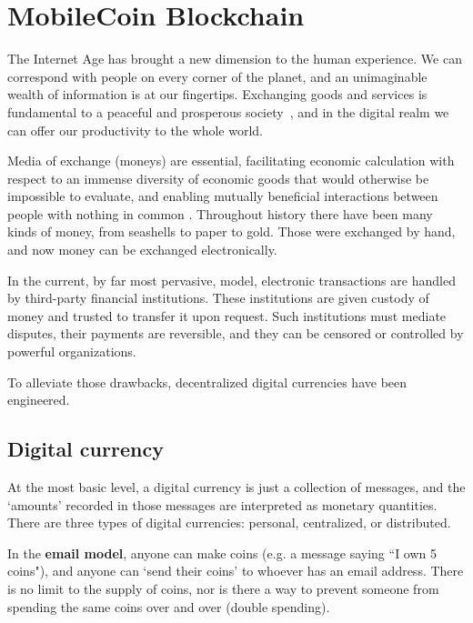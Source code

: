 \chapter{MobileCoin Blockchain}
\label{chapter:blockchain}

The Internet Age has brought a new dimension to the human experience. We can correspond with people on every corner of the planet, and an unimaginable wealth of information is at our fingertips. Exchanging goods and services is fundamental to a peaceful and prosperous society~\cite{human-action}, and in the digital realm we can offer our productivity to the whole world.

Media of exchange (moneys) are essential, facilitating economic calculation with respect to an immense diversity of economic goods that would otherwise be impossible to evaluate, and enabling mutually beneficial interactions between people with nothing in common \cite{human-action}. Throughout history there have been many kinds of money, from seashells to paper to gold. Those were exchanged by hand, and now money can be exchanged electronically.

In the current, by far most pervasive, model, electronic transactions are handled by third-party financial institutions. These institutions are given custody of money and trusted to transfer it upon request. Such institutions must mediate disputes, their payments are reversible, and they can be censored or controlled by powerful organizations. \cite{Nakamoto_bitcoin}

To alleviate those drawbacks, decentralized digital currencies have been engineered.



\section{Digital currency}
\label{sec:digital-currency}

At the most basic level, a digital currency is just a collection of messages, and the `amounts' recorded in those messages are interpreted as monetary quantities. There are three types of digital currencies: personal, centralized, or distributed.

In the \textbf{email model}, anyone can make coins (e.g. a message saying ``I own 5 coins"), and anyone can `send their coins' to whoever has an email address. There is no limit to the supply of coins, nor is there a way to prevent someone from spending the same coins over and over (double spending).

